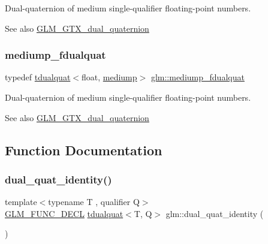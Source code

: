 Dual-\/quaternion of medium single-\/qualifier floating-\/point numbers.

\begin{DoxySeeAlso}{See also}
\hyperlink{group__gtx__dual__quaternion}{G\+L\+M\+\_\+\+G\+T\+X\+\_\+dual\+\_\+quaternion} 
\end{DoxySeeAlso}
\mbox{\label{group__gtx__dual__quaternion_ga93e9def86ffeedd48d9c79a6afacfa6c}} 
\subsubsection{\texorpdfstring{mediump\+\_\+fdualquat}{mediump\_fdualquat}}
{\footnotesize\ttfamily typedef \hyperlink{structglm_1_1tdualquat}{tdualquat}$<$float, \hyperlink{namespaceglm_a36ed105b07c7746804d7fdc7cc90ff25a6416f3ea0c9025fb21ed50c4d6620482}{mediump}$>$ \hyperlink{group__gtx__dual__quaternion_ga93e9def86ffeedd48d9c79a6afacfa6c}{glm\+::mediump\+\_\+fdualquat}}

Dual-\/quaternion of medium single-\/qualifier floating-\/point numbers.

\begin{DoxySeeAlso}{See also}
\hyperlink{group__gtx__dual__quaternion}{G\+L\+M\+\_\+\+G\+T\+X\+\_\+dual\+\_\+quaternion} 
\end{DoxySeeAlso}


\subsection{Function Documentation}
\mbox{\label{group__gtx__dual__quaternion_ga0b35c0e30df8a875dbaa751e0bd800e0}} 
\subsubsection{\texorpdfstring{dual\+\_\+quat\+\_\+identity()}{dual\_quat\_identity()}}
{\footnotesize\ttfamily template$<$typename T , qualifier Q$>$ \\
\hyperlink{setup_8hpp_ab2d052de21a70539923e9bcbf6e83a51}{G\+L\+M\+\_\+\+F\+U\+N\+C\+\_\+\+D\+E\+CL} \hyperlink{structglm_1_1tdualquat}{tdualquat}$<$T, Q$>$ glm\+::dual\+\_\+quat\+\_\+identity (\begin{DoxyParamCaption}{ }\end{DoxyParamCaption})}

